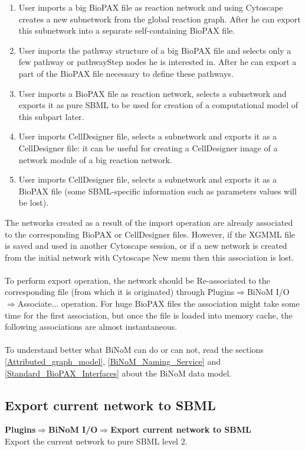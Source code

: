 \begin{enumerate}
\item User imports a big BioPAX file as reaction network and using Cytoscape creates a new subnetwork from the global reaction graph. After he can export this subnetwork into a separate self-containing BioPAX file.
\item User imports the pathway structure of a big BioPAX file and selects only a few pathway or pathwayStep nodes he is interested in. After he can export a part of the BioPAX file necessary to define these pathways.
\item User imports a BioPAX file as reaction network, selects a subnetwork and exports it as pure SBML to be used for creation of a computational model of this subpart later.
\item User imports CellDesigner file, selects a subnetwork and exports it as a CellDesigner file: it can be useful for creating a CellDesigner image of a network module of a big reaction network.
\item User imports CellDesigner file, selects a subnetwork and exports it as a BioPAX file (some SBML-specific information such as parameters values will be lost).
\end{enumerate}
The networks created as a result of the import operation are already associated to the corresponding BioPAX or CellDesigner files. However, if the XGMML file is saved and used in another Cytoscape session, or if a new network is created from the initial network with Cytoscape New menu then this association is lost.\\\\
To perform export operation, the network should be Re-associated to the corresponding file (from which it is originated) through Plugins$\Rightarrow$BiNoM I/O$\Rightarrow$Associate$\ldots$ operation. For huge BioPAX files the association might take some time for the first association, but once the file is loaded into memory cache, the following associations are almost instantaneous.\\\\
To understand better what BiNoM can do or can not, read the sections \ref{Attributed_graph_model}, \ref{BiNoM_Naming_Service} and \ref{Standard_BioPAX_Interfaces} about the BiNoM data model.

\subsection{Export current network to SBML}
\textbf{Plugins$\Rightarrow$BiNoM I/O$\Rightarrow$Export current network to SBML}\\
Export the current network to pure SBML level 2.

